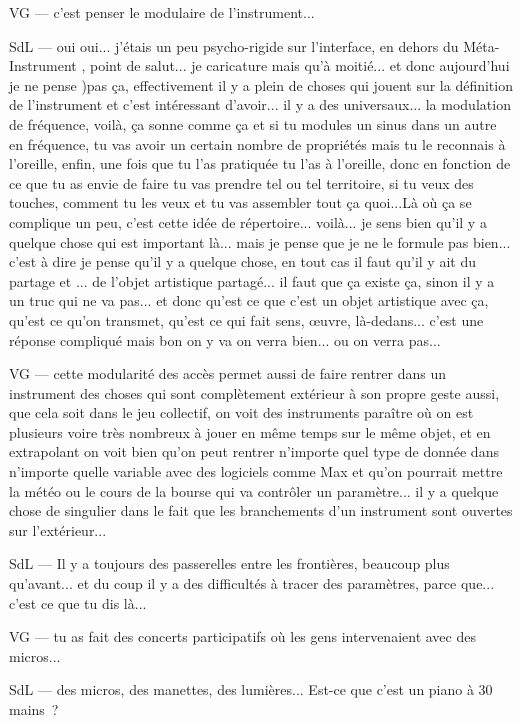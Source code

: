VG — c'est penser le modulaire de l'instrument... 

SdL — oui oui... j'étais un peu psycho-rigide sur l'interface, en dehors du Méta-Instrument , point de salut... je caricature mais qu'à moitié... et donc aujourd'hui je ne pense )pas ça, effectivement il y a plein de choses qui jouent sur la définition de l'instrument et c'est intéressant d'avoir... il y a des universaux... la modulation de fréquence, voilà, ça sonne comme ça et si tu modules un sinus dans un autre en fréquence, tu vas avoir un certain nombre de propriétés mais tu le reconnais à l'oreille, enfin, une fois que tu l'as pratiquée tu l'as à l'oreille, donc en fonction de ce que tu as envie de faire tu vas prendre tel ou tel territoire, si tu veux des touches, comment tu les veux et tu vas assembler tout ça quoi...Là où ça se complique un peu, c'est cette idée de répertoire... voilà... je sens bien qu'il y a quelque chose qui est important là... mais je pense que je ne le formule pas bien... c'est à dire je pense qu'il y a quelque chose, en tout cas il faut qu'il y ait du partage et ... de l'objet artistique partagé... il faut que ça existe ça, sinon il y a un truc qui ne va pas... et donc qu'est ce que c'est un objet artistique avec ça, qu'est ce qu'on transmet, qu'est ce qui fait sens, œuvre, là-dedans... c'est une réponse compliqué mais bon on y va on verra bien... ou on verra pas... 

VG — cette modularité des accès permet aussi de faire rentrer dans un instrument des choses qui sont complètement extérieur à son propre geste aussi, que cela soit dans le jeu collectif, on voit des instruments paraître où on est plusieurs voire très nombreux à jouer en même temps sur le même objet, et en extrapolant on voit bien qu'on peut rentrer n'importe quel type de donnée dans n'importe quelle variable avec des logiciels comme Max et qu'on pourrait mettre la météo ou le cours de la bourse qui va contrôler un paramètre... il y a quelque chose de singulier dans le fait que les branchements d'un instrument sont ouvertes sur l'extérieur... 

SdL — Il y a toujours des passerelles entre les frontières, beaucoup plus qu'avant... et du coup il y a des difficultés à tracer des paramètres, parce que... c'est ce que tu dis là... 

VG — tu as fait des concerts participatifs où les gens intervenaient avec des micros... 

SdL — des micros, des manettes, des lumières... Est-ce que c'est un piano à 30 mains ? 

